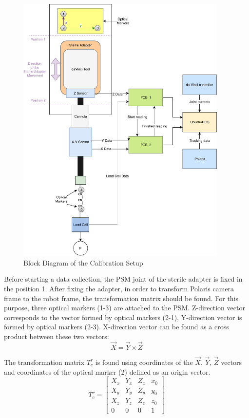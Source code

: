 \begin{figure}[h]
	\begin{center}
	\includegraphics[width=105mm]{fig/methods/block_diagram_of_calib_setup.pdf}
	\end{center}
	\vspace{-4mm}
	\caption[Block Diagram of the Calibration Setup]
	{Block Diagram of the Calibration Setup}
	\label{fig:Calib_setup_BD}
	\vspace{-2mm}
\end{figure}

	Before starting a data collection, the PSM joint of the sterile adapter is fixed in the position 1. After fixing the adapter, in order to transform Polaris camera frame to the robot frame, the transformation matrix should be found. For this purpose, three optical markers (1-3) are attached to the PSM. Z-direction vector corresponds to the vector formed by optical markers (2-1), Y-direction vector is formed by optical markers (2-3). X-direction vector can be found as a cross product between these two vectors:
\begin{equation}
\vec{X} = \vec{Y}\times \vec{Z}
\end{equation}

	The transformation matrix $T_{c}^{ r}$ is found using coordinates of the $\vec{X}$, $\vec{Y}$, $\vec{Z}$ vectors and coordinates of the optical marker (2) defined as an origin vector.
\begin{equation}
T_{c}^{ r} = 
\begin{bmatrix}
    X_{x} 	& Y_{x} 		& Z_{x} 		&  x_{0} \\
    X_{y} 	& Y_{y} 		& Z_{y} 		&  y_{0} \\
    X_{z} 	& Y_{z} 		& Z_{z} 		&  z_{0} \\
    0		 	& 0 			& 0 			& 1
\end{bmatrix}
\end{equation}

